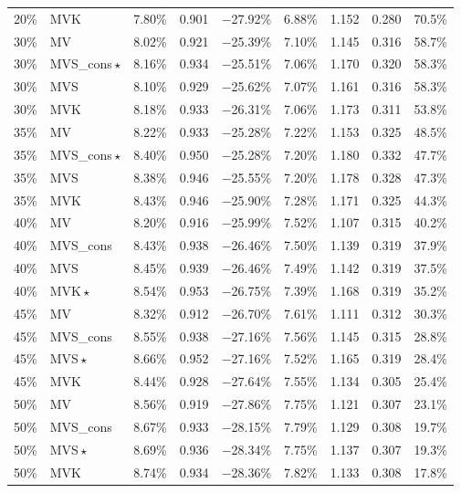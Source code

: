 \documentclass[12pt, a4paper]{article}
\begin{document}
\begin{longtable}{llrrrrrrr}
20\% & MVK          & 7.80\% & 0.901 & $-$27.92\% & 6.88\% & 1.152 & 0.280 & 70.5\% \\[3pt]
30\% & MV           & 8.02\% & 0.921 & $-$25.39\% & 7.10\% & 1.145 & 0.316 & 58.7\% \\
30\% & MVS\_cons\,$\star$ & 8.16\% & 0.934 & $-$25.51\% & 7.06\% & 1.170 & 0.320 & 58.3\% \\
30\% & MVS          & 8.10\% & 0.929 & $-$25.62\% & 7.07\% & 1.161 & 0.316 & 58.3\% \\
30\% & MVK          & 8.18\% & 0.933 & $-$26.31\% & 7.06\% & 1.173 & 0.311 & 53.8\% \\[3pt]
35\% & MV           & 8.22\% & 0.933 & $-$25.28\% & 7.22\% & 1.153 & 0.325 & 48.5\% \\
35\% & MVS\_cons\,$\star$ & 8.40\% & 0.950 & $-$25.28\% & 7.20\% & 1.180 & 0.332 & 47.7\% \\
35\% & MVS          & 8.38\% & 0.946 & $-$25.55\% & 7.20\% & 1.178 & 0.328 & 47.3\% \\
35\% & MVK          & 8.43\% & 0.946 & $-$25.90\% & 7.28\% & 1.171 & 0.325 & 44.3\% \\[3pt]
40\% & MV           & 8.20\% & 0.916 & $-$25.99\% & 7.52\% & 1.107 & 0.315 & 40.2\% \\
40\% & MVS\_cons    & 8.43\% & 0.938 & $-$26.46\% & 7.50\% & 1.139 & 0.319 & 37.9\% \\
40\% & MVS          & 8.45\% & 0.939 & $-$26.46\% & 7.49\% & 1.142 & 0.319 & 37.5\% \\
40\% & MVK\,$\star$ & 8.54\% & 0.953 & $-$26.75\% & 7.39\% & 1.168 & 0.319 & 35.2\% \\[3pt]
45\% & MV           & 8.32\% & 0.912 & $-$26.70\% & 7.61\% & 1.111 & 0.312 & 30.3\% \\
45\% & MVS\_cons    & 8.55\% & 0.938 & $-$27.16\% & 7.56\% & 1.145 & 0.315 & 28.8\% \\
45\% & MVS\,$\star$ & 8.66\% & 0.952 & $-$27.16\% & 7.52\% & 1.165 & 0.319 & 28.4\% \\
45\% & MVK          & 8.44\% & 0.928 & $-$27.64\% & 7.55\% & 1.134 & 0.305 & 25.4\% \\[3pt]
50\% & MV           & 8.56\% & 0.919 & $-$27.86\% & 7.75\% & 1.121 & 0.307 & 23.1\% \\
50\% & MVS\_cons    & 8.67\% & 0.933 & $-$28.15\% & 7.79\% & 1.129 & 0.308 & 19.7\% \\
50\% & MVS\,$\star$ & 8.69\% & 0.936 & $-$28.34\% & 7.75\% & 1.137 & 0.307 & 19.3\% \\
50\% & MVK          & 8.74\% & 0.934 & $-$28.36\% & 7.82\% & 1.133 & 0.308 & 17.8\% \\
\end{longtable}
\end{document}
